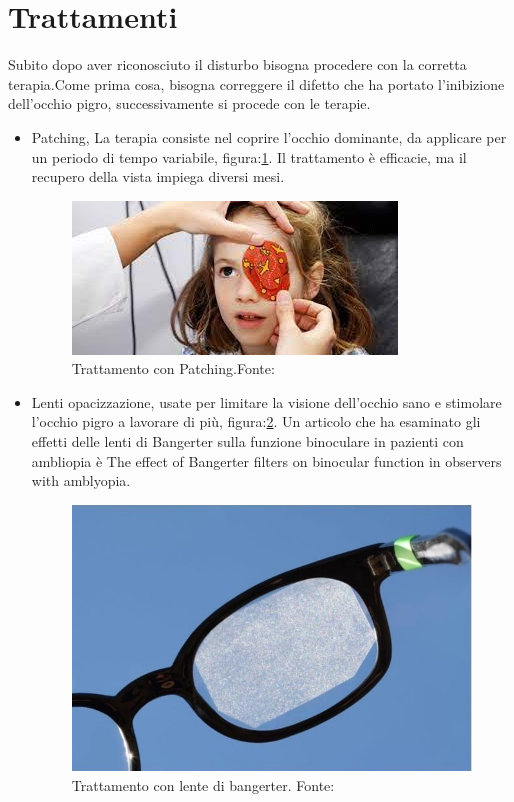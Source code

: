\documentclass[
a4paper,
cleardoublepage=empty,
headings=twolinechapter,
numbers=autoenddot,
]{scrbook}
\begin{document}
	\section{Trattamenti}
	Subito dopo aver riconosciuto il disturbo bisogna procedere con la corretta terapia.Come prima cosa, bisogna correggere il difetto che ha portato l'inibizione dell'occhio pigro, successivamente si procede con le terapie.
	\begin{itemize}
		\item Patching\cite{patching}, La terapia consiste nel coprire l'occhio dominante, da applicare per un periodo di tempo variabile, figura:\ref{fig:patching}.
		Il trattamento è efficacie, ma il recupero della vista impiega diversi mesi.       	   
		\begin{figure}[H]
			\centering
			\includegraphics[width=0.7\linewidth]{image/patching}
			\caption{Trattamento con Patching.Fonte:\cite{Patching_image}}
			\label{fig:patching}
		\end{figure}	
		
		\item Lenti opacizzazione, usate per limitare la visione dell'occhio sano e stimolare l'occhio pigro a lavorare di più, figura:\ref{fig:penalizzazione-ottica}. Un articolo che ha esaminato gli effetti delle lenti di Bangerter sulla funzione binoculare in pazienti con ambliopia è The effect of Bangerter filters on binocular function in observers with amblyopia\cite{filtro}.
		\begin{figure}[h]
			\centering
			\includegraphics[width=0.5\linewidth]{image/penalizzazione ottica}
			\caption{Trattamento con lente di bangerter.
				Fonte:\cite{Bangerter_image}}
			\label{fig:penalizzazione-ottica}
		\end{figure}
		

\end{itemize}
\end{document}
